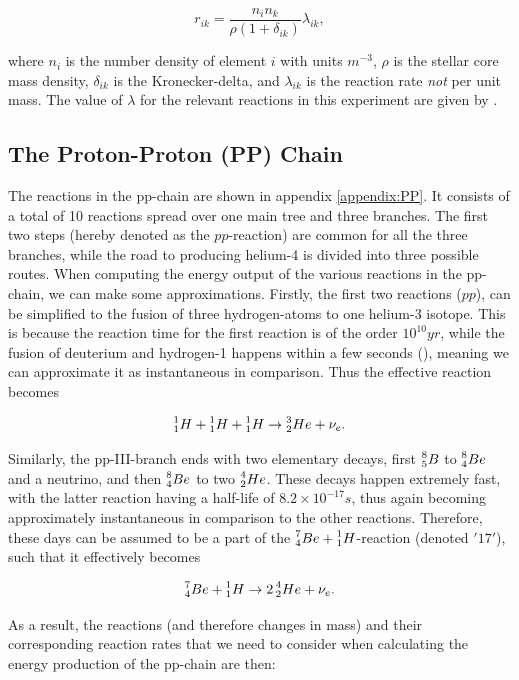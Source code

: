 \documentclass[a4paper,10pt,english]{article}
\begin{document}
$$r_{ik} = \frac{n_i n_k}{\rho(1 + \delta_{ik})} \lambda_{ik},$$

where $n_i$ is the number density of element $i$ with units $m^{-3}$,  $\rho$ is the stellar core mass density, $\delta_{ik}$ is the Kronecker-delta, and $\lambda_{ik}$ is the reaction rate \textit{not} per unit mass. The value of $\lambda$ for the relevant reactions in this experiment are given by \cite{Caughlan1988}.  

\subsection{The Proton-Proton (PP) Chain}

The reactions in the pp-chain are shown in appendix \ref{appendix:PP}. It consists of a total of 10 reactions spread over one main tree and three branches. The first two steps (hereby denoted as the $pp$-reaction) are common for all the three branches, while the road to producing helium-4 is divided into three possible routes. When computing the energy output of the various reactions in the pp-chain, we can make some approximations. Firstly, the first two reactions ($pp$), can be simplified to the fusion of three hydrogen-atoms to one helium-3 isotope. This is because the reaction time for the first reaction is of the order $10^{10} yr$, while the fusion of deuterium and hydrogen-1 happens within a few seconds (\cite{Gudiksen2015}), meaning we can approximate it as instantaneous in comparison. Thus the effective reaction becomes

$$\prescript{1}{1}{H} + \prescript{1}{1}{H} + \prescript{1}{1}{H} \rightarrow \prescript{3}{2}{He} + \nu_e.$$

Similarly, the pp-III-branch ends with two elementary decays, first $\prescript{8}{5}{B}$ to $\prescript{8}{4}{Be}$ and a neutrino, and then $\prescript{8}{4}{Be}$ to two $\prescript{4}{2}{He}$. These decays happen extremely fast, with the latter reaction having a half-life of $8.2\times 10^{-17}s$\cite{Gudiksen2015}, thus again becoming approximately instantaneous in comparison to the other reactions. Therefore, these days can be assumed to be a part of the $\prescript{7}{4}{Be} + \prescript{1}{1}{H}$-reaction (denoted $'17'$), such that it effectively becomes

$$\prescript{7}{4}{Be} + \prescript{1}{1}{H} \rightarrow 2\prescript{4}{2}{He} + \nu_e.$$

As a result, the reactions (and therefore changes in mass) and their corresponding reaction rates that we need to consider when calculating the energy production of the pp-chain are then:
\end{document}

